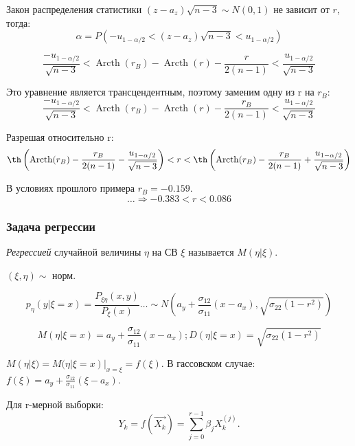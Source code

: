 \begin{corollary*}
Закон распределения статистики $(z-a_z) \sqrt{n-3} \sim N(0, 1)$ не зависит от $r$, тогда:
\[
  \alpha = P(-u_{1-\alpha/2} < (z-a_z) \sqrt{n-3} < u_{1 - \alpha/2})
\]

\[
  \frac{-u_{1-\alpha/2}}{\sqrt{n-3}} < \operatorname{Arcth} (r_B) - \operatorname{Arcth} (r) - \frac{r}{2(n-1)} < \frac{u_{1-\alpha/2}}{\sqrt{n-3}}
\]

Это уравнение является трансцендентным, поэтому заменим одну из r на $r_B$:
\[
  \frac{-u_{1-\alpha/2}}{\sqrt{n-3}} < \operatorname{Arcth} (r_B) - \operatorname{Arcth} (r) - \frac{r_B}{2(n-1)} < \frac{u_{1-\alpha/2}}{\sqrt{n-3}}
\]

Разрешая относительно r:
\[
  \th \left( \operatorname{Arcth}(r_B) - \frac{r_B}{2(n-1)} - \frac{u_{1-\alpha/2}}{\sqrt{n-3}} \right)
  < r
  < \th \left( \operatorname{Arcth}(r_B) - \frac{r_B}{2(n-1)} + \frac{u_{1-\alpha/2}}{\sqrt{n-3}} \right)
\]

\begin{ex}
  В условиях прошлого примера $r_B = -0.159$.
  \[
    \dots \Rightarrow -0.383 < r < 0.086
  \]
\end{ex}

\subsubsection{Задача регрессии}

\begin{definition}
  \emph{Регрессией} случайной величины $\eta$ на СВ $\xi$ называется $M(\eta | \xi)$.   
\end{definition}

\begin{ex}
  $(\xi, \eta) \sim$ норм.

  \[
    p_\eta (y | \xi=x) = \frac{P_{\xi\eta} (x, y)}{P_\xi(x)} \dots \sim N\left(a_y+\frac{\sigma_{12}}{\sigma_{11}}(x-a_x), \sqrt{\sigma_{22} (1-r^2)}\right)
  \]

  \[
    M(\eta | \xi=x) = a_y + \frac{\sigma_{12}}{\sigma_{11}} (x-a_x);
    D(\eta | \xi=x) = \sqrt{\sigma_{22} (1-r^2) }
  \]

  $M(\eta | \xi) = M(\eta | \xi=x) |_{x=\xi} = f(\xi)$.
  В гассовском случае:
  $f(\xi) = a_y + \frac{\sigma_{12}}{\sigma_{11}} (\xi - a_x)$.

  Для r-мерной выборки:
  \[
    Y_k = f(\vec{X_k}) = \sum_{j=0}^{r-1} \beta_j X_k^{(j)}.
  \]
\end{ex}


\end{corollary*}
